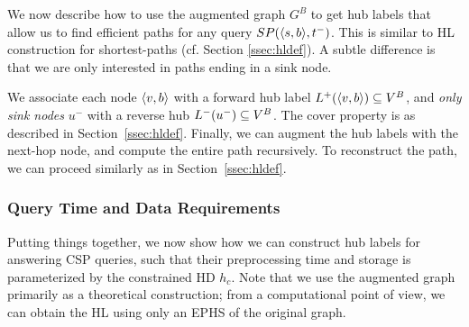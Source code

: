 We now describe how to use the augmented graph $G^B$ to get hub labels that allow us to find efficient paths for any query $SP(\langle s,b\rangle,t^-)$.
This is similar to HL construction for shortest-paths (cf. Section \ref{ssec:hldef}).
A subtle difference is that we are only interested in paths ending in a sink node.

We associate each node $\langle v,b\rangle$ with a forward hub label $L^+(\langle v,b\rangle)\subseteq V^B$, and \emph{only sink nodes} $u^-$ with a reverse hub $L^-(u^-)\subseteq V^B$.
The cover property is as described in Section~\ref{ssec:hldef}.
Finally, we can augment the hub labels with the next-hop node, and compute the entire path recursively.
To reconstruct the path, we can proceed similarly as in Section~\ref{ssec:hldef}.


\subsubsection{Query Time and Data Requirements}
Putting things together, we now show how we can construct hub labels for answering CSP queries, such that their preprocessing time and storage is parameterized by the constrained HD $h_c$.
Note that we use the augmented graph primarily as a theoretical construction; from a computational point of view, we can obtain the HL using only an EPHS of the original graph.

